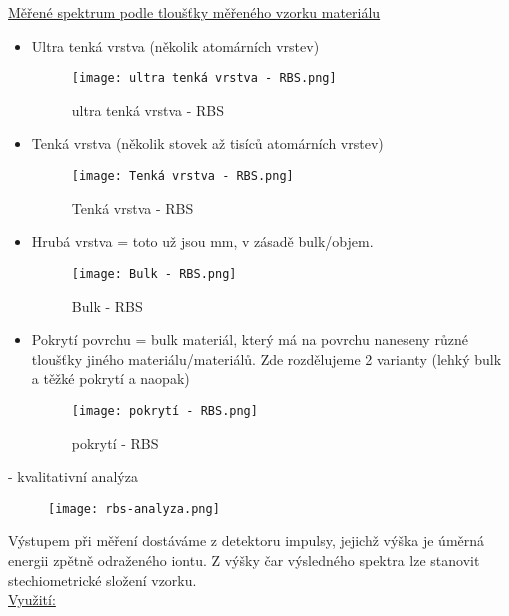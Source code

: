 \underline{Měřené spektrum podle tloušťky měřeného vzorku materiálu}
\begin{itemize}
    \item Ultra tenká vrstva (několik atomárních vrstev)

    \begin{figure}[ht!]
        \centering
        \texttt{[image: ultra tenká vrstva - RBS.png]}
        \caption{ultra tenká vrstva - RBS}
    \end{figure}

    \item Tenká vrstva (několik stovek až tisíců atomárních vrstev)

    \begin{figure}[ht!]
        \centering
        \texttt{[image: Tenká vrstva - RBS.png]}
        \caption{Tenká vrstva - RBS}
    \end{figure}

    \item Hrubá vrstva = toto už jsou mm, v zásadě bulk/objem.

    \begin{figure}[ht!]
        \centering
        \texttt{[image: Bulk - RBS.png]}
        \caption{Bulk - RBS}
    \end{figure}

    \item Pokrytí povrchu = bulk materiál, který má na povrchu naneseny různé tloušťky jiného materiálu/materiálů. Zde rozdělujeme 2 varianty (lehký bulk a těžké pokrytí a naopak)

    \begin{figure}[ht!]
        \centering
        \texttt{[image: pokrytí - RBS.png]}
        \caption{pokrytí - RBS}
    \end{figure}
\end{itemize}

\noindent- kvalitativní analýza 
\begin{figure}[ht!]
	\texttt{[image: rbs-analyza.png]}
\end{figure}


Výstupem při měření dostáváme z detektoru impulsy, jejichž výška je úměrná energii zpětně odraženého iontu. Z výšky čar výsledného spektra lze stanovit stechiometrické složení vzorku.\\

\underline{Využití:}

